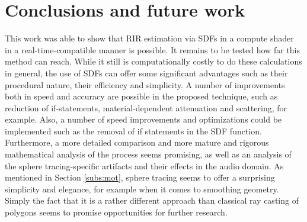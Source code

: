 \documentclass[twoside,a4paper]{article}
\begin{document}
\section{Conclusions and future work}
\label{sec:concl}

This work was able to show that RIR estimation via SDFs in a compute shader in a real-time-compatible manner is possible. It remains to be tested how far this method can reach. While it still is computationally costly to do these calculations in general, the use of SDFs can offer some significant advantages such as their procedural nature, their efficiency and simplicity. A number of improvements both in speed and accuracy are possible in the proposed technique, such as reduction of if-statements, material-dependent attenuation and scattering, for example. Also, a number of speed improvements and optimizations could be implemented such as the removal of if statements in the SDF function. Furthermore, a more detailed comparison and more mature and rigorous mathematical analysis of the process seems promising, as well as an analysis of the sphere tracing-specific artifacts and their effects in the audio domain. As mentioned in Section \ref{subs:mot}, sphere tracing seems to offer a surprising simplicity and elegance, for example when it comes to smoothing geometry. Simply the fact that it is a rather different approach than classical ray casting of polygons seems to promise opportunities for further research. 
\end{document}
